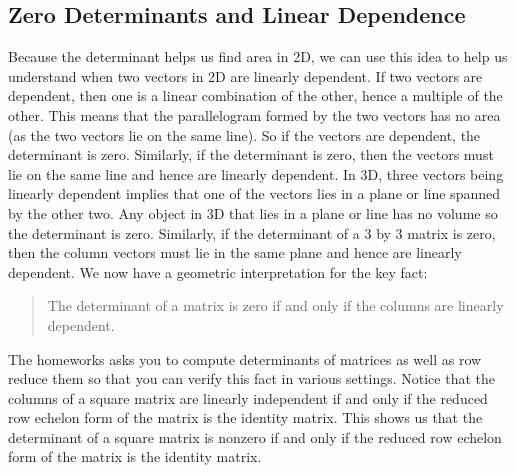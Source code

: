 \subsection{Zero Determinants and Linear Dependence}
Because the determinant helps us find area in 2D, we can use this idea to help us understand when two vectors in 2D are linearly dependent.  
If two vectors are dependent, then one is a linear combination of the other, hence a multiple of the other.  
This means that the parallelogram formed by the two vectors has no area (as the two vectors lie on the same line).  
So if the vectors are dependent, the determinant is zero.  
Similarly, if the determinant is zero, then the vectors must lie on the same line and hence are linearly dependent.  
In 3D, three vectors being linearly dependent implies that one of the vectors lies in a plane or line spanned by the other two.
Any object in 3D that lies in a plane or line has no volume so the determinant is zero.  
Similarly, if the determinant of a 3 by 3 matrix is zero, then the column vectors must lie in the same plane and hence are linearly dependent. 
We now have a geometric interpretation for the key fact:
\begin{quote}The determinant of a matrix is zero if and only if the columns are linearly dependent.\end{quote}
The homeworks asks you to compute determinants of matrices as well as row reduce them so that you can verify this fact in various settings. 
Notice that the columns of a square matrix are linearly independent if and only if the reduced row echelon form of the matrix is the identity matrix. 
This shows us that the determinant of a square matrix is nonzero if and only if the reduced row echelon form of the matrix is the identity matrix. 




